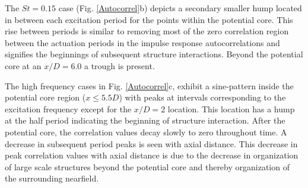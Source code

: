 \documentclass[english]{aiaa-tc}
\begin{document}
The $St=0.15$ case (Fig. \ref{Autocorrel}b) depicts a secondary smaller hump located in between each excitation period for the points within the potential core. This rise between periods is similar to removing most of the zero correlation region between the actuation periods in the impulse response autocorrelations and signifies the beginnings of subsequent structure interactions. Beyond the potential core at an $x/D=6.0$ a trough is present. %

The high frequency cases in Fig. \ref{Autocorrel}c, exhibit a sine-pattern inside the potential core region ($x\leq5.5D$) with peaks at intervals corresponding to the excitation frequency except for the $x/D=2$ location. This location has a hump at the half period indicating the beginning of structure interaction. After the potential core, the correlation values decay slowly to zero throughout time. A decrease in subsequent period peaks is seen with axial distance. This decrease in peak correlation values with axial distance is due to the decrease in organization of large scale structures beyond the potential core and thereby organization of the surrounding nearfield. %
\end{document}
